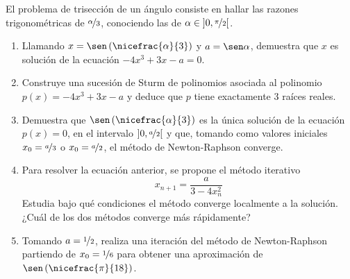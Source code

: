 \begin{ejercicio}
    El problema de trisección de un ángulo consiste en hallar las razones trigonométricas de $\nicefrac{\alpha}{3}$, conociendo las de $\alpha \in \left]0,\nicefrac{\pi}{2}\right[$.
    \begin{enumerate}
        \item Llamando $x = \sen\left(\nicefrac{\alpha}{3}\right)$ y $a = \sen \alpha$, demuestra que $x$ es solución de la ecuación $-4x^3 + 3x - a = 0$.
        \item Construye una sucesión de Sturm de polinomios asociada al polinomio $p(x) = -4x^3 + 3x - a$ y deduce que $p$ tiene exactamente 3 raíces reales.
        \item Demuestra que $\sen\left(\nicefrac{\alpha}{3}\right)$ es la única solución de la ecuación $p(x) = 0$, en el intervalo $\left]0,\nicefrac{a}{2}\right[$ y que, tomando como valores iniciales $x_0 = \nicefrac{a}{3}$ o $x_0 = \nicefrac{a}{2}$, el método de Newton-Raphson converge.
        \item Para resolver la ecuación anterior, se propone el método iterativo
        \[
            x_{n+1} = \frac{a}{3- 4x_n^2}
        \]
        Estudia bajo qué condiciones el método converge localmente a la solución. ¿Cuál de los dos métodos converge más rápidamente?
        \item Tomando $a = \nicefrac{1}{2}$, realiza una iteración del método de Newton-Raphson partiendo de $x_0 = \nicefrac{1}{6}$ para obtener una aproximación de $\sen\left(\nicefrac{\pi}{18}\right)$.
    \end{enumerate}
\end{ejercicio}


